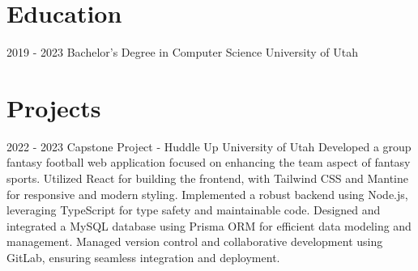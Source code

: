 \documentclass[]{friggeri-cv}
\begin{document}
\section{Education}
\begin{entrylist}
  \entry
    {2019 - 2023}
    {Bachelor's Degree in Computer Science}
    {University of Utah}
    {}
\end{entrylist}

\section{Projects}
\begin{entrylist}
  \entry
    {2022 - 2023}
    {Capstone Project - Huddle Up}
    {University of Utah}
    { Developed a group fantasy football web application focused on enhancing the team aspect of fantasy sports.
      Utilized React for building the frontend, with Tailwind CSS and Mantine for responsive and modern styling.
      Implemented a robust backend using Node.js, leveraging TypeScript for type safety and maintainable code.
      Designed and integrated a MySQL database using Prisma ORM for efficient data modeling and management.
      Managed version control and collaborative development using GitLab, ensuring seamless integration and deployment.}
\end{entrylist}
\end{document}
